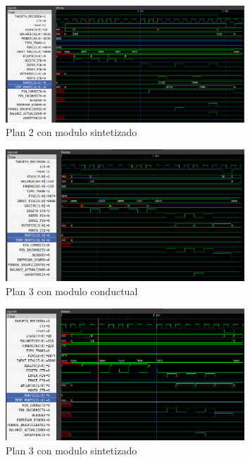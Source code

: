 \begin{figure}[H]\label{fig:B2}
    \centering
    \includegraphics[width=0.8\textwidth]{imagenes/B2.png}
    \caption{Plan 2 con modulo sintetizado}
\end{figure}

\begin{figure}[H]\label{fig:A3}
    \centering
    \includegraphics[width=0.8\textwidth]{imagenes/A3.png}
    \caption{Plan 3 con modulo conductual}
\end{figure}

\begin{figure}[H]\label{fig:B3}
    \centering
    \includegraphics[width=0.8\textwidth]{imagenes/B3.png}
    \caption{Plan 3 con modulo sintetizado}
\end{figure}

